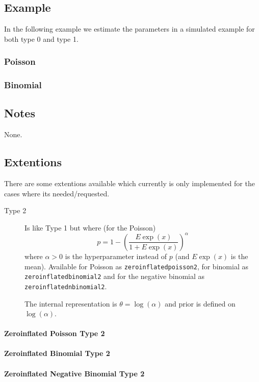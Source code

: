 \documentclass[a4paper,11pt]{article}
\begin{document}
\subsection*{Example}

In the following example we estimate the parameters in a simulated
example for both type 0 and type 1.
\subsubsection*{Poisson}



\subsubsection*{Binomial}



\subsection*{Notes}

None.




\subsection*{Extentions}

There are some extentions available which currently is only
implemented for the cases where its needed/requested.
\begin{description}
\item[Type 2] Is like Type 1 but where (for the Poisson)
    \begin{displaymath}
        p = 1-\left( \frac{E\exp(x)}{1 + E\exp(x)}\right)^{\alpha}
    \end{displaymath}
    where $\alpha > 0$ is the hyperparameter instead of $p$ (and
    $E\exp(x)$ is the mean).  Available for Poisson as
    \texttt{zeroinflatedpoisson2}, for binomial as
    \texttt{zeroinflatedbinomial2} and for the negative binomial as
    \texttt{zeroinflatednbinomial2}.

    The internal representation is $\theta = \log(\alpha)$ and prior
    is defined on $\log(\alpha)$.
\end{description}

\paragraph{Zeroinflated Poisson Type 2}


\paragraph{Zeroinflated Binomial Type 2}


\paragraph{Zeroinflated Negative Binomial Type 2}

\end{document}
